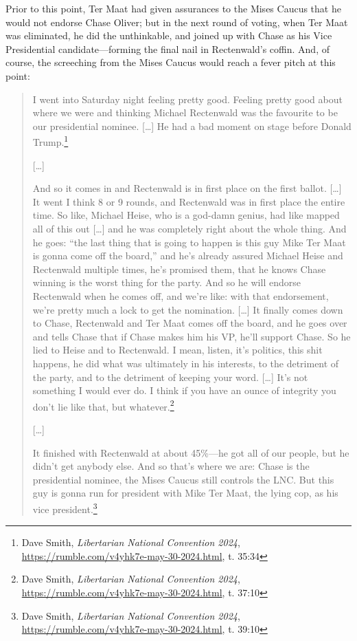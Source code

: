 \documentclass[11pt]{article}
\begin{document}
Prior to this point, Ter Maat had given assurances to the Mises Caucus that he would not endorse Chase Oliver; but in the next round of voting, when Ter Maat was eliminated, he did the unthinkable, and joined up with Chase as his Vice Presidential candidate---forming the final nail in Rectenwald's coffin. And, of course, the screeching from the Mises Caucus would reach a fever pitch at this point:
\begin{quote}
I went into Saturday night feeling pretty good. Feeling pretty good about where we were and thinking Michael Rectenwald was the favourite to be our presidential nominee. [\ldots{}] He had a bad moment on stage before Donald Trump.\footnote{Dave Smith, \emph{Libertarian National Convention 2024}, \url{https://rumble.com/v4yhk7e-may-30-2024.html}, t. 35:34}

{[}\ldots{}]

And so it comes in and Rectenwald is in first place on the first ballot. [\ldots{}] It went I think 8 or 9 rounds, and Rectenwald was in first place the entire time. So like, Michael Heise, who is a god-damn genius, had like mapped all of this out [\ldots{}] and he was completely right about the whole thing. And he goes: ``the last thing that is going to happen is this guy Mike Ter Maat is gonna come off the board,'' and he's already assured Michael Heise and Rectenwald multiple times, he's promised them, that he knows Chase winning is the worst thing for the party. And so he will endorse Rectenwald when he comes off, and we're like: with that endorsement, we're pretty much a lock to get the nomination. [\ldots{}] It finally comes down to Chase, Rectenwald and Ter Maat comes off the board, and he goes over and tells Chase that if Chase makes him his VP, he'll support Chase. So he lied to Heise and to Rectenwald. I mean, listen, it's politics, this shit happens, he did what was ultimately in his interests, to the detriment of the party, and to the detriment of keeping your word. [\ldots{}] It's not something I would ever do. I think if you have an ounce of integrity you don't lie like that, but whatever.\footnote{Dave Smith, \emph{Libertarian National Convention 2024}, \url{https://rumble.com/v4yhk7e-may-30-2024.html}, t. 37:10}

{[}\ldots{}]

It finished with Rectenwald at about 45\%---he got all of our people, but he didn't get anybody else. And so that's where we are: Chase is the presidential nominee, the Mises Caucus still controls the LNC. But this guy is gonna run for president with Mike Ter Maat, the lying cop, as his vice president.\footnote{Dave Smith, \emph{Libertarian National Convention 2024}, \url{https://rumble.com/v4yhk7e-may-30-2024.html}, t. 39:10}


\end{quote}
\end{document}
